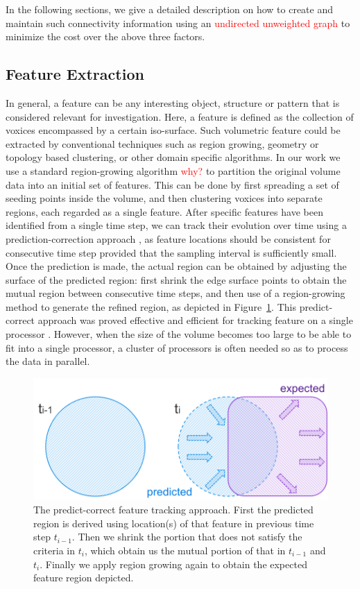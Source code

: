 \documentclass[10pt, conference, compsocconf]{IEEEtran}
\begin{document}
In the following sections, we give a detailed description on how to create and maintain such connectivity information using an \textcolor{red}{undirected unweighted graph} to minimize the cost over the above three factors.

\subsection{Feature Extraction}

In general, a feature can be any interesting object, structure or pattern that is considered relevant for investigation. Here, a feature is defined as the collection of voxices encompassed by a certain iso-surface. Such volumetric feature could be extracted by conventional techniques such as region growing, geometry or topology based clustering, or other domain specific algorithms. In our work we use a standard region-growing algorithm \textcolor{red}{why?} \cite{Huang2003} to partition the original volume data into an initial set of features. This can be done by first spreading a set of seeding points inside the volume, and then clustering voxices into separate regions, each regarded as a single feature. After specific features have been identified from a single time step, we can track their evolution over time using a prediction-correction approach \cite{Muelder2009}, as feature locations should be consistent for consecutive time step provided that the sampling interval is sufficiently small. Once the prediction is made, the actual region can be obtained by adjusting the surface of the predicted region: first shrink the edge surface points to obtain the mutual region between consecutive time steps, and then use of a region-growing method to generate the refined region, as depicted in Figure~\ref{fig:predict-correct}. This predict-correct approach was proved effective and efficient for tracking feature on a single processor \cite{Muelder2009}. However, when the size of the volume becomes too large to be able to fit into a single processor, a cluster of processors is often needed so as to process the data in parallel. 

\begin{figure}[ht]
	\centering
	\includegraphics[width=0.9\linewidth]{predict_correct.png}
	\caption{The predict-correct feature tracking approach. First the predicted region is derived using location(s) of that feature in previous time step $t_{i-1}$. Then we shrink the portion that does not satisfy the criteria in $t_i$, which obtain us the mutual portion of that in $t_{i-1}$ and $t_i$. Finally we apply region growing again to obtain the expected feature region depicted.}
	\label{fig:predict-correct}
\end{figure}
\end{document}
